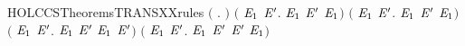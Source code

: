 \begin{SaveVerbatim}{HOLCCSTheoremsTRANSXXrules}
\HOLTokenTurnstile{} \ensuremath{(}\HOLSymConst{\HOLTokenForall{}} . \HOLSymConst{\ensuremath{\ldotp}} \HOLTokenTransBegin{}\HOLTokenTransEnd {}\ensuremath{)} \HOLSymConst{\HOLTokenConj{}} \ensuremath{(}\HOLSymConst{\HOLTokenForall{}}  \ensuremath{\HOLBoundVar{E}\sb{\mathrm{1}}} \ensuremath{\HOLBoundVar{E}\sp{\prime{}}}.  \HOLTokenTransBegin{}\HOLTokenTransEnd \ensuremath{\HOLBoundVar{E}\sb{\mathrm{1}}} \HOLSymConst{\HOLTokenImp{}}  \HOLSymConst{\ensuremath{+}} \ensuremath{\HOLBoundVar{E}\sp{\prime{}}} \HOLTokenTransBegin{}\HOLTokenTransEnd \ensuremath{\HOLBoundVar{E}\sb{\mathrm{1}}}\ensuremath{)} \HOLSymConst{\HOLTokenConj{}}
   \ensuremath{(}\HOLSymConst{\HOLTokenForall{}}  \ensuremath{\HOLBoundVar{E}\sb{\mathrm{1}}} \ensuremath{\HOLBoundVar{E}\sp{\prime{}}}.  \HOLTokenTransBegin{}\HOLTokenTransEnd \ensuremath{\HOLBoundVar{E}\sb{\mathrm{1}}} \HOLSymConst{\HOLTokenImp{}} \ensuremath{\HOLBoundVar{E}\sp{\prime{}}} \HOLSymConst{\ensuremath{+}}  \HOLTokenTransBegin{}\HOLTokenTransEnd \ensuremath{\HOLBoundVar{E}\sb{\mathrm{1}}}\ensuremath{)} \HOLSymConst{\HOLTokenConj{}}
   \ensuremath{(}\HOLSymConst{\HOLTokenForall{}}  \ensuremath{\HOLBoundVar{E}\sb{\mathrm{1}}} \ensuremath{\HOLBoundVar{E}\sp{\prime{}}}.  \HOLTokenTransBegin{}\HOLTokenTransEnd \ensuremath{\HOLBoundVar{E}\sb{\mathrm{1}}} \HOLSymConst{\HOLTokenImp{}}  \HOLSymConst{\ensuremath{\mid}} \ensuremath{\HOLBoundVar{E}\sp{\prime{}}} \HOLTokenTransBegin{}\HOLTokenTransEnd \ensuremath{\HOLBoundVar{E}\sb{\mathrm{1}}} \HOLSymConst{\ensuremath{\mid}} \ensuremath{\HOLBoundVar{E}\sp{\prime{}}}\ensuremath{)} \HOLSymConst{\HOLTokenConj{}}
   \ensuremath{(}\HOLSymConst{\HOLTokenForall{}}  \ensuremath{\HOLBoundVar{E}\sb{\mathrm{1}}} \ensuremath{\HOLBoundVar{E}\sp{\prime{}}}.  \HOLTokenTransBegin{}\HOLTokenTransEnd \ensuremath{\HOLBoundVar{E}\sb{\mathrm{1}}} \HOLSymConst{\HOLTokenImp{}} \ensuremath{\HOLBoundVar{E}\sp{\prime{}}} \HOLSymConst{\ensuremath{\mid}}  \HOLTokenTransBegin{}\HOLTokenTransEnd \ensuremath{\HOLBoundVar{E}\sp{\prime{}}} \HOLSymConst{\ensuremath{\mid}} \ensuremath{\HOLBoundVar{E}\sb{\mathrm{1}}}\ensuremath{)} \HOLSymConst{\HOLTokenConj{}}

\end{SaveVerbatim}
